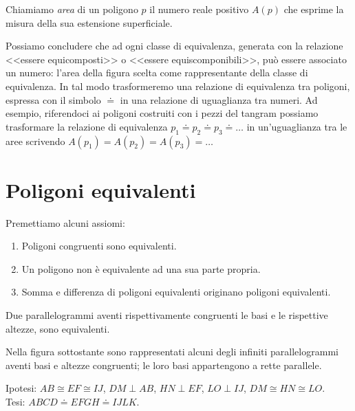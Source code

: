 \begin{definizione}
Chiamiamo \emph{area} di un poligono \(p\) il numero reale positivo 
\(A(p)\) che esprime la misura della sua estensione superficiale.
\end{definizione}

Possiamo concludere che ad ogni classe di equivalenza, generata con 
la relazione <<essere equicomposti>> o <<essere equiscomponibili>>, 
può essere associato un numero: l'area della figura scelta come 
rappresentante della classe di equivalenza. In tal modo trasformeremo 
una relazione di equivalenza tra poligoni, espressa con il simbolo 
\(\doteq\) in una relazione di uguaglianza tra numeri.
Ad esempio, riferendoci ai poligoni costruiti con i pezzi del tangram 
possiamo trasformare la relazione di equivalenza \(p_1\doteq p_2\doteq 
p_3\doteq \ldots{}\) in un'uguaglianza tra le aree scrivendo 
\(A(p_1)=A(p_2)=A(p_3)=\ldots{}\)

\section{Poligoni equivalenti}
\label{sect:poligoni_equivalenti}

Premettiamo alcuni assiomi:
\nopagebreak
\begin{enumerate} [noitemsep]
\item Poligoni congruenti sono equivalenti.
\item Un poligono non è equivalente ad una sua parte propria.
\item Somma e differenza di poligoni equivalenti originano poligoni 
equivalenti.
\end{enumerate}

\begin{teorema}\label{teo:7.1}
Due parallelogrammi aventi rispettivamente congruenti le basi e le 
rispettive altezze, sono equivalenti.
\end{teorema}

Nella figura sottostante sono rappresentati alcuni degli infiniti 
parallelogrammi aventi basi e altezze congruenti; le loro basi 
appartengono a rette parallele.

\noindent Ipotesi: \(AB\cong EF\cong IJ\), \(DM\perp AB\), \(HN\perp EF\), 
\(LO\perp IJ\), \(DM\cong HN\cong LO\).\\
Tesi: \(ABCD\doteq EFGH\doteq IJLK\).\\

\begin{figure*}[!htb]
  
\centering
\end{figure*}

